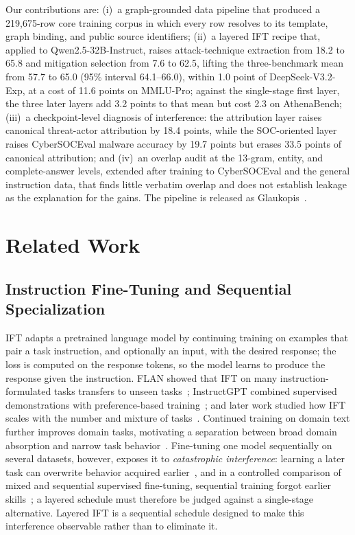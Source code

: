 \documentclass[conference]{IEEEtran}
\begin{document}
Our contributions are: (i)~a graph-grounded data pipeline that produced a 219,675-row core training corpus in which every row resolves to its template, graph binding, and public source identifiers; (ii)~a layered IFT recipe that, applied to Qwen2.5-32B-Instruct, raises attack-technique extraction from 18.2 to 65.8 and mitigation selection from 7.6 to 62.5, lifting the three-benchmark mean from 57.7 to 65.0 (95\% interval 64.1--66.0), within 1.0 point of DeepSeek-V3.2-Exp, at a cost of 11.6 points on MMLU-Pro; against the single-stage first layer, the three later layers add 3.2 points to that mean but cost 2.3 on AthenaBench; (iii)~a checkpoint-level diagnosis of interference: the attribution layer raises canonical threat-actor attribution by 18.4 points, while the SOC-oriented layer raises CyberSOCEval malware accuracy by 19.7 points but erases 33.5 points of canonical attribution; and (iv)~an overlap audit at the 13-gram, entity, and complete-answer levels, extended after training to CyberSOCEval and the general instruction data, that finds little verbatim overlap and does not establish leakage as the explanation for the gains. The pipeline is released as Glaukopis~\cite{glaukopis}.

\section{Related Work}\label{sec:related}
\subsection{Instruction Fine-Tuning and Sequential Specialization}
IFT adapts a pretrained language model by continuing training on examples that pair a task instruction, and optionally an input, with the desired response; the loss is computed on the response tokens, so the model learns to produce the response given the instruction. FLAN showed that IFT on many instruction-formulated tasks transfers to unseen tasks~\cite{wei2022flan}; InstructGPT combined supervised demonstrations with preference-based training~\cite{ouyang2022training}; and later work studied how IFT scales with the number and mixture of tasks~\cite{chung2024scaling}. Continued training on domain text further improves domain tasks, motivating a separation between broad domain absorption and narrow task behavior~\cite{gururangan2020dont}. Fine-tuning one model sequentially on several datasets, however, exposes it to \emph{catastrophic interference}: learning a later task can overwrite behavior acquired earlier~\cite{mccloskey1989catastrophic}, and in a controlled comparison of mixed and sequential supervised fine-tuning, sequential training forgot earlier skills~\cite{dong2024composition}; a layered schedule must therefore be judged against a single-stage alternative. Layered IFT is a sequential schedule designed to make this interference observable rather than to eliminate it.
\end{document}
